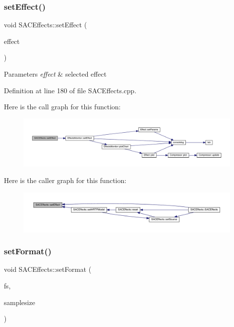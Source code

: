 \subsubsection{\texorpdfstring{set\+Effect()}{setEffect()}}
{\footnotesize\ttfamily void S\+A\+C\+Effects\+::set\+Effect (\begin{DoxyParamCaption}\item[{\hyperlink{class_effect_a6422fe21e9e452943fbc3344884a6fed}{Effect\+::effect\+ID}}]{effect }\end{DoxyParamCaption})}


\begin{DoxyParams}{Parameters}
{\em effect} & selected effect \\
\hline
\end{DoxyParams}


Definition at line 180 of file S\+A\+C\+Effects.\+cpp.

Here is the call graph for this function\+:
\nopagebreak
\begin{figure}[H]
\begin{center}
\leavevmode
\includegraphics[width=350pt]{class_s_a_c_effects_ab57fa3b5c11bafba4c2e471a80964c14_cgraph}
\end{center}
\end{figure}
Here is the caller graph for this function\+:
\nopagebreak
\begin{figure}[H]
\begin{center}
\leavevmode
\includegraphics[width=350pt]{class_s_a_c_effects_ab57fa3b5c11bafba4c2e471a80964c14_icgraph}
\end{center}
\end{figure}
\mbox{\label{class_s_a_c_effects_a3d06db323bc9a3a1bbfe810f2a30d10f}} 
\subsubsection{\texorpdfstring{set\+Format()}{setFormat()}}
{\footnotesize\ttfamily void S\+A\+C\+Effects\+::set\+Format (\begin{DoxyParamCaption}\item[{int}]{fs,  }\item[{int}]{samplesize }\end{DoxyParamCaption})}


